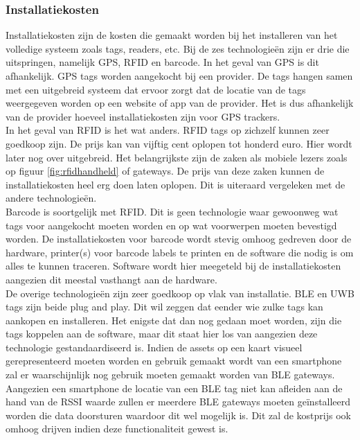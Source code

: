 \subsubsection{Installatiekosten}
Installatiekosten zijn de kosten die gemaakt worden bij het installeren van het volledige systeem zoals tags, readers, etc. Bij de zes technologieën zijn er drie die uitspringen, namelijk GPS, RFID en barcode. In het geval van GPS is dit afhankelijk. GPS tags worden aangekocht bij een provider. De tags hangen samen met een uitgebreid systeem dat ervoor zorgt dat de locatie van de tags weergegeven worden op een website of app van de provider. Het is dus afhankelijk van de provider hoeveel installatiekosten zijn voor GPS trackers.\\

In het geval van RFID is het wat anders. RFID tags op zichzelf kunnen zeer goedkoop zijn. De prijs kan van vijftig cent oplopen tot honderd euro. Hier wordt later nog over uitgebreid. Het belangrijkste zijn de zaken als mobiele lezers zoals op figuur \ref{fig:rfidhandheld} of gateways. De prijs van deze zaken kunnen de installatiekosten heel erg doen laten oplopen. Dit is uiteraard vergeleken met de andere technologieën.\\

Barcode is soortgelijk met RFID. Dit is geen technologie waar gewoonweg wat tags voor aangekocht moeten worden en op wat voorwerpen moeten bevestigd worden. De installatiekosten voor barcode wordt stevig omhoog gedreven door de hardware, printer(s) voor barcode labels te printen en de software die nodig is om alles te kunnen traceren. Software wordt hier meegeteld bij de installatiekosten aangezien dit meestal vasthangt aan de hardware.\\

De overige technologieën zijn zeer goedkoop op vlak van installatie. BLE en UWB tags zijn beide plug and play. Dit wil zeggen dat eender wie zulke tags kan aankopen en installeren. Het enigste dat dan nog gedaan moet worden, zijn die tags koppelen aan de software, maar dit staat hier los van aangezien deze technologie gestandaardiseerd is. Indien de assets op een kaart visueel gerepresenteerd moeten worden en gebruik gemaakt wordt van een smartphone zal er waarschijnlijk nog gebruik moeten gemaakt worden van BLE gateways. Aangezien een smartphone de locatie van een BLE tag niet kan afleiden aan de hand van de RSSI waarde zullen er meerdere BLE gateways moeten geïnstalleerd worden die data doorsturen waardoor dit wel mogelijk is. Dit zal de kostprijs ook omhoog drijven indien deze functionaliteit gewest is. \\

